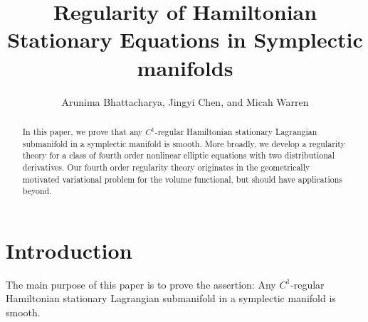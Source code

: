 \documentclass[12pt,leqno]{amsart}%
\theoremstyle{plain}
\numberwithin{equation}{section}
\theoremstyle{definition}
\begin{document}
\title[Hamiltonian Stationary equations]{Regularity of Hamiltonian Stationary Equations in Symplectic manifolds}
\author{Arunima Bhattacharya, Jingyi Chen, and Micah Warren}
\address{Department of Mathematics\\
	University of Washington, Seattle, WA 98195}

\address{Department of Mathematics\\
	 University of British Columbia, Vancouver,
	BC V6T 1Z2}

\address{Department of Mathematics\\
	University of Oregon, Eugene, OR 97403}



\maketitle

\begin{abstract}
In this paper, we prove that any $C^{1}$-regular Hamiltonian stationary
Lagrangian submanifold in a symplectic manifold is smooth. More broadly, we
develop a regularity theory for a class of fourth order nonlinear elliptic
equations with two distributional derivatives. Our fourth order regularity
theory originates in the geometrically motivated variational problem for the volume
functional, but should have applications beyond.

\end{abstract}


\section{Introduction}

The main purpose of this paper is to prove the assertion: Any $C^{1}$-regular
Hamiltonian stationary Lagrangian submanifold in a symplectic manifold is
smooth. \let\thefootnote\relax{}
\end{document}
